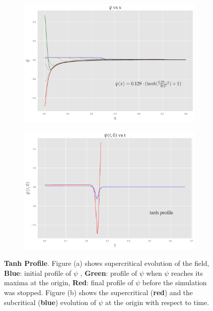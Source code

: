 \begin{figure}
    \centering
    \begin{subfigure}[b]{0.85\textwidth}
        \includegraphics[width=1\linewidth]{images/super_tanh.pdf}
        \caption{}
        \label{fig:tanh}
    \end{subfigure}

    \begin{subfigure}[b]{0.85\textwidth}
        \includegraphics[width=1\linewidth]{images/at0_tanh.pdf}
        \caption{}
        \label{fig:at0_tanh}
    \end{subfigure}
    \caption[Evolution of $\psi$ from an initial tanh profile]{\textbf{Tanh Profile}. Figure (a) shows supercritical evolution of the field, \textbf{Blue}: initial profile of $\psi$ , \textbf{Green}: profile of $\psi$ when $\psi$ reaches its maxima at the origin, \textbf{Red}: final profile of $\psi$ before the simulation was stopped. Figure (b) shows the supercritical (\textbf{red}) and the subcritical (\textbf{blue}) evolution of $\psi$ at the origin with respect to time.}
\end{figure}

